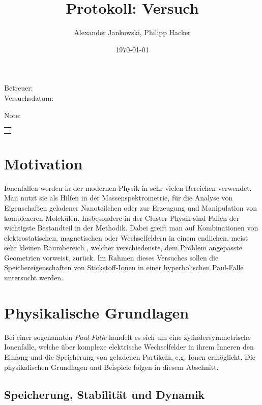 \documentclass[numbers=noenddot,a4paper,notitlepage,twoside,BCOR15mm]{scrartcl}
\title{Protokoll: Versuch} %
\author{Alexander Jankowski, Philipp Hacker}
\date{\today}
\newcommand{\tilt}[1]{\textit{#1}}
\begin{document}
	\maketitle
	\begin{center}
		Betreuer: \\ %
		Versuchsdatum: \\ %
		\begin{table}[h]
			\centering
			Note: %
			\begin{tabularx}{1.5cm}{|X|}
				\hline \\ \\
				\hline
			\end{tabularx}
		\end{table}
	\end{center}
	\vspace*{\fill}
	\tableofcontents
	\vfill
	\clearpage
	\section{Motivation}

		Ionenfallen werden in der modernen Physik in sehr vielen Bereichen verwendet. Man nutzt sie als Hilfen in der Massenspektrometrie, für die Analyse von Eigenschaften geladener Nanoteilchen oder zur Erzeugung und Manipulation von komplexeren Molekülen. Insbesondere in der Cluster-Physik sind Fallen der wichtigste Bestandteil in der Methodik. Dabei greift man auf Kombinationen von elektrostatischen, magnetischen oder Wechselfeldern in einem endlichen, meist sehr kleinen Raumbereich , welcher verschiedenste, dem Problem angepasste Geometrien vorweist, zurück. Im Rahmen dieses Versuches sollen die Speichereigenschaften von Stickstoff-Ionen in einer hyperbolischen Paul-Falle untersucht werden. 


	\clearpage
	\section{Physikalische Grundlagen}

		Bei einer sogenannten \tilt{Paul-Falle} handelt es sich um eine zylindersymmetrische Ionenfalle, welche über komplexe elektrische Wechselfelder in ihrem Inneren den Einfang und die Speicherung von geladenen Partikeln, e.g. Ionen ermöglicht. Die physikalischen Grundlagen und Beispiele folgen in diesem Abschnitt.

		\subsection{Speicherung, Stabilität und Dynamik}
\end{document}
